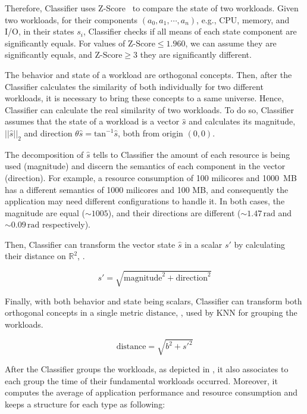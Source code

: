 Therefore, Classifier uses Z-Score~\cite{?} to compare the state of two
workloads.  Given two workloads, for their components $(a_0, a_1, \cdots,
a_n)$, e.g., CPU, memory, and I/O, in their states $s_i$, Classifier checks if
all means of each state component are significantly equals. For values of
$\text{Z-Score} \leq 1.960$, we can assume they are significantly equals, and
$\text{Z-Score} \geq 3$ they are significantly different.

The behavior and state of a workload are orthogonal concepts. Then, after the
Classifier calculates the similarity of both individually for two different
workloads,  it is necessary to bring these concepts to a same universe. Hence,
Classifier can calculate the real similarity of two workloads.  To do so,
Classifier assumes that the state of a workload is a vector $\hat{s}$ and
calculates its magnitude, $||\hat{s}||_2$ and direction $\theta \hat{s} =
\text{tan}^{-1} \hat{s}$, both from origin $(0,0)$.

The decomposition of $\hat{s}$ tells to Classifier the amount of each resource
is being used (magnitude) and discern the semantics of each component in the
vector (direction). For example, a resource consumption of 100 milicores and
1000 MB has a different semantics of 1000 milicores and 100 MB, and consequently
the application may need different configurations to handle it. In both cases,
the magnitude are equal ($\sim 1005$), and their directions are different ($\sim
1.47\,\text{rad}$ and $\sim 0.09\,\text{rad}$ respectively).

Then, Classifier can transform the vector state $\hat{s}$ in a scalar $s'$ by
calculating their distance on $\mathbb{R}^2$, .

\begin{equation}
  s' = \sqrt{\text{magnitude}^2 + \text{direction}^2}
  \label{eq:distance1}
\end{equation}

Finally, with both behavior and state being scalars, Classifier can transform
both orthogonal concepts in a single metric $\text{distance}$,
, used by KNN for grouping the workloads.

\begin{equation}
  \text{distance} = \sqrt{b^2 + s'^2}
  \label{eq:distance2}
\end{equation}

After the Classifier groups the workloads, as depicted in
, it also associates to each group the time of
their fundamental workloads occurred. Moreover, it computes the average of application
performance and resource consumption and keeps a structure for each type as following:

